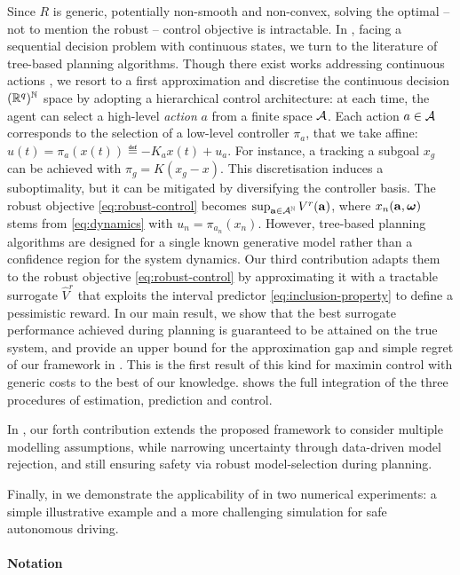 \documentclass{article}
\begin{document}
Since $R$ is generic, potentially non-smooth and non-convex, solving the optimal -- not to mention the robust -- control objective is intractable. In , facing a sequential decision problem with continuous states, we turn to the literature of tree-based planning algorithms. Though there exist works addressing continuous actions \citep{Busoniu2018,Weinstein2012}, we resort to a first approximation and discretise the continuous decision $(\mathbb{R}^q)^{\mathbb{N}}$ space by adopting a hierarchical control architecture: at each time, the agent can select a high-level \emph{action} $a$ from a finite space $\mathcal{A}$. Each action $a\in\mathcal{A}$ corresponds to the selection of a low-level controller $\pi_a$, that we take affine: $u(t) = \pi_a(x(t)) \eqdef -K_a x(t) + u_a.$ For instance, a tracking a subgoal $x_g$ can be achieved with $\pi_g = K(x_g - x)$. This discretisation induces a suboptimality, but it can be mitigated by diversifying the controller basis.
The robust objective \eqref{eq:robust-control} becomes $\sup_{\mathbf{a}\in{\mathcal{A}}^{\mathbb{N}}} V^r(\mathbf{a})$, where $x_n(\mathbf{a}, \bm{\omega})$ stems from \eqref{eq:dynamics} with $u_n = \pi_{a_n}(x_n)$.
However, tree-based planning algorithms are designed for a single known generative model rather than a confidence region for the system dynamics. Our third contribution adapts them to the robust objective \eqref{eq:robust-control} by approximating it with a tractable surrogate $\hat{V}^r$ that exploits the interval predictor \eqref{eq:inclusion-property} to define a pessimistic reward. In our main result, we show that the best surrogate performance achieved during planning is guaranteed to be attained on the true system, and provide an upper bound for the approximation gap and simple regret of our framework in . This is the first result of this kind for maximin control with generic costs to the best of our knowledge.  shows the full integration of the three procedures of estimation, prediction and control. 

In , our forth contribution extends the proposed framework to consider multiple modelling assumptions, while narrowing uncertainty through data-driven model rejection, and still ensuring safety via robust model-selection during planning.

Finally, in  we demonstrate the applicability of  in two numerical experiments: a simple illustrative example and a more challenging simulation for safe autonomous driving.

\paragraph{Notation}
\end{document}
